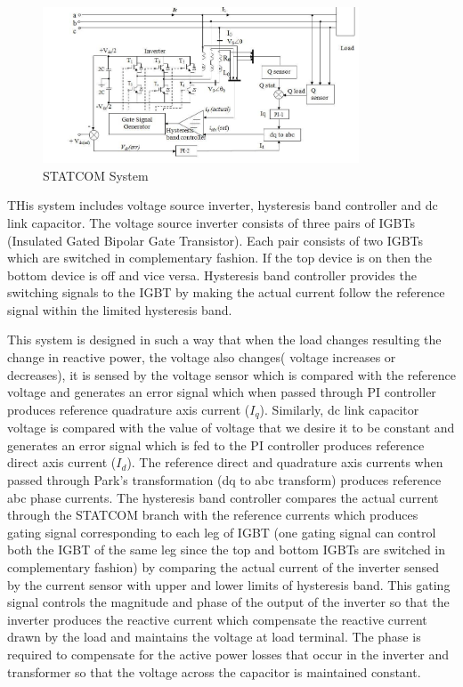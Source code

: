 \documentclass[journal,twoside]{IEEEtran}
\begin{document}
\begin{figure}[!ht]
\includegraphics[width=3.7in]{1}
\caption{STATCOM System}
\label{f1}
\end{figure}

THis system includes voltage source inverter, hysteresis band controller and dc link capacitor.
The voltage source inverter consists of three
pairs of IGBTs (Insulated Gated Bipolar Gate
Transistor). Each pair consists of two IGBTs
which are switched in complementary fashion. If
the top device is on then the bottom device is off
and vice versa. Hysteresis
band controller
provides the switching signals to the IGBT by
making the actual current follow the reference
signal within the limited hysteresis band.

\bigskip
This system is designed in such a way that when
the load changes resulting the change in reactive
power, the voltage also changes( voltage
increases or decreases), it is sensed by the
voltage sensor which is compared with the reference voltage and generates an error signal
which when passed through PI controller
produces reference quadrature axis current ($I_q$).
Similarly, dc link capacitor voltage is compared
with the value of voltage that we desire it to be
constant and generates an error signal which is
fed to the PI controller produces reference direct
axis current ($I_d$). The reference direct and
quadrature axis currents when passed through
Park’s transformation (dq to abc transform)
produces reference abc phase currents. The
hysteresis band controller compares the actual
current through the STATCOM branch with the
reference currents which produces gating signal
corresponding to each leg of IGBT (one gating
signal can control both the IGBT of the same leg
since the top and bottom IGBTs are switched in complementary fashion) by comparing the
actual current of the inverter sensed by the
current sensor with upper and lower limits of
hysteresis band. This gating signal controls the
magnitude and phase of the output of the
inverter so that the inverter produces the
reactive current which compensate the reactive current drawn by the load and maintains the
voltage at load terminal. The phase is required to
compensate for the active power losses that
occur in the inverter and transformer so that the
voltage across the capacitor is maintained
constant.
\end{document}
